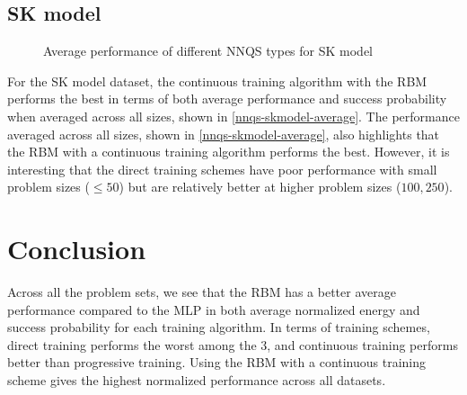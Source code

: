 \subsection{SK model}

\begin{figure}[!htbp]
    \centering
    \hfill
    \caption{Average performance of different NNQS types for SK model}
    \label{nnqs-skmodel-average}
\end{figure}

For the SK model dataset, the continuous training algorithm with the RBM performs the best in terms of both average performance and success probability when averaged across all sizes, shown in \autoref{nnqs-skmodel-average}. The performance averaged across all sizes, shown in \autoref{nnqs-skmodel-average}, also highlights that the RBM with a continuous training algorithm performs the best. However, it is interesting that the direct training schemes have poor performance with small problem sizes ($\leq 50$) but are relatively better at higher problem sizes ($100, 250$).

\section{Conclusion}
Across all the problem sets, we see that the RBM has a better average performance compared to the MLP in both average normalized energy and success probability for each training algorithm. In terms of training schemes, direct training performs the worst among the 3, and continuous training performs better than progressive training. Using the RBM with a continuous training scheme gives the highest normalized performance across all datasets.

